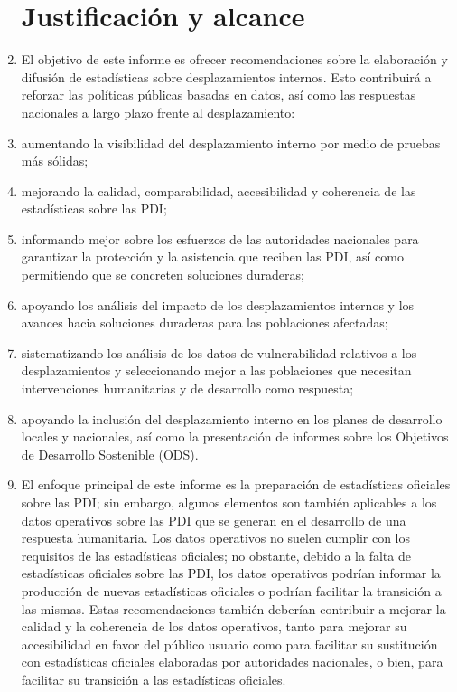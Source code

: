 \documentclass[
]{book}
\begin{document}
\begin{enumerate}
{  \section{Justificación y alcance}\label{justificaciuxf3n-y-alcance}}
\item
  El objetivo de este informe es ofrecer recomendaciones sobre la elaboración y difusión de estadísticas sobre desplazamientos internos. Esto contribuirá a reforzar las políticas públicas basadas en datos, así como las respuestas nacionales a largo plazo frente al desplazamiento:
\item
  aumentando la visibilidad del desplazamiento interno por medio de pruebas más sólidas;
\item
  mejorando la calidad, comparabilidad, accesibilidad y coherencia de las estadísticas sobre las PDI;
\item
  informando mejor sobre los esfuerzos de las autoridades nacionales para garantizar la protección y la asistencia que reciben las PDI, así como permitiendo que se concreten soluciones duraderas;
\item
  apoyando los análisis del impacto de los desplazamientos internos y los avances hacia soluciones duraderas para las poblaciones afectadas;
\item
  sistematizando los análisis de los datos de vulnerabilidad relativos a los desplazamientos y seleccionando mejor a las poblaciones que necesitan intervenciones humanitarias y de desarrollo como respuesta;
\item
  apoyando la inclusión del desplazamiento interno en los planes de desarrollo locales y nacionales, así como la presentación de informes sobre los Objetivos de Desarrollo Sostenible (ODS).
\item
  El enfoque principal de este informe es la preparación de estadísticas oficiales sobre las PDI; sin embargo, algunos elementos son también aplicables a los datos operativos sobre las PDI que se generan en el desarrollo de una respuesta humanitaria. Los datos operativos no suelen cumplir con los requisitos de las estadísticas oficiales; no obstante, debido a la falta de estadísticas oficiales sobre las PDI, los datos operativos podrían informar la producción de nuevas estadísticas oficiales o podrían facilitar la transición a las mismas. Estas recomendaciones también deberían contribuir a mejorar la calidad y la coherencia de los datos operativos, tanto para mejorar su accesibilidad en favor del público usuario como para facilitar su sustitución con estadísticas oficiales elaboradas por autoridades nacionales, o bien, para facilitar su transición a las estadísticas oficiales.

\end{enumerate}
\end{document}
